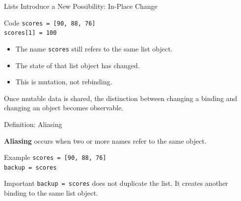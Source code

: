 \documentclass[aspectratio=169,10pt]{beamer}
\begin{document}
\begin{frame}{Lists Introduce a New Possibility: In-Place Change}
  \begin{block}{Code}
    \texttt{scores = [90, 88, 76]}\\
    \texttt{scores[1] = 100}
  \end{block}

  \begin{itemize}
    \item The name \texttt{scores} still refers to the same list object.
    \item The state of that list object has changed.
    \item This is mutation, not rebinding.
  \end{itemize}

  \begin{keyidea}
    Once mutable data is shared, the distinction between changing a binding and changing an object becomes observable.
  \end{keyidea}
\end{frame}



\begin{frame}{Definition: Aliasing}
  \begin{cpdefinition}
    \textbf{Aliasing} occurs when two or more names refer to the same object.
  \end{cpdefinition}

  \begin{block}{Example}
    \texttt{scores = [90, 88, 76]}\\
    \texttt{backup = scores}
  \end{block}

  \begin{alertblock}{Important}
    \texttt{backup = scores} does not duplicate the list. It creates another binding to the same list object.
  \end{alertblock}
\end{frame}
\end{document}
